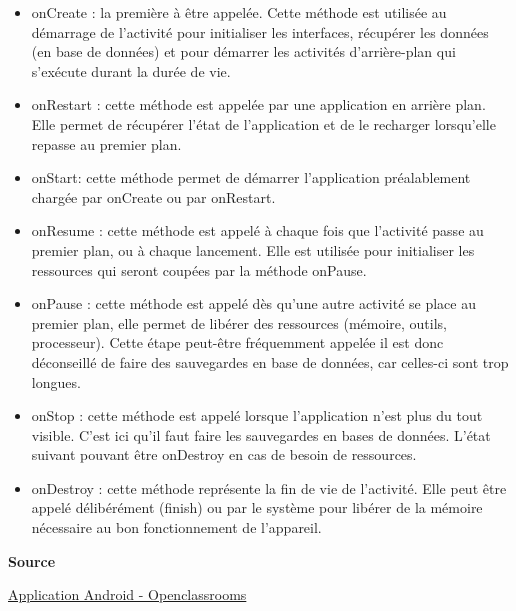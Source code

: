 \documentclass[francais,12pt]{article}
\begin{document}
		\begin{itemize}
			\item onCreate : la première à être appelée. Cette méthode est utilisée au démarrage de l'activité pour initialiser les interfaces, récupérer les données (en base de données) et pour démarrer les activités d'arrière-plan qui s'exécute durant la durée de vie.
			\item onRestart : cette méthode est appelée par une application en arrière plan. Elle permet de récupérer l'état de l'application et de le recharger lorsqu'elle repasse au premier plan.
			\item onStart: cette méthode permet de démarrer l'application préalablement chargée par onCreate ou par onRestart.
			\item onResume : cette méthode est appelé à chaque fois que l'activité passe au premier plan, ou à chaque lancement. Elle est utilisée pour initialiser les ressources qui seront coupées par la méthode onPause. 
			\item onPause : cette méthode est appelé dès qu'une autre activité se place au premier plan, elle permet de libérer des ressources (mémoire, outils, processeur). Cette étape peut-être fréquemment appelée il est donc déconseillé de faire des sauvegardes en base de données, car celles-ci sont trop longues.
			\item onStop : cette méthode est appelé lorsque l'application n'est plus du tout visible. C'est ici qu'il faut faire les sauvegardes en bases de données. L'état suivant pouvant être onDestroy en cas de besoin de ressources. 
			\item onDestroy : cette méthode représente la fin de vie de l'activité. Elle peut être appelé délibérément (finish) ou par le système pour libérer de la mémoire nécessaire au bon fonctionnement de l'appareil.		
		\end{itemize}
		
		\textbf{Source}
        
        \href{https://openclassrooms.com/courses/creez-des-applications-pour-android/preambule-quelques-concepts-avances}{Application Android - Openclassrooms}
        
\end{document}
